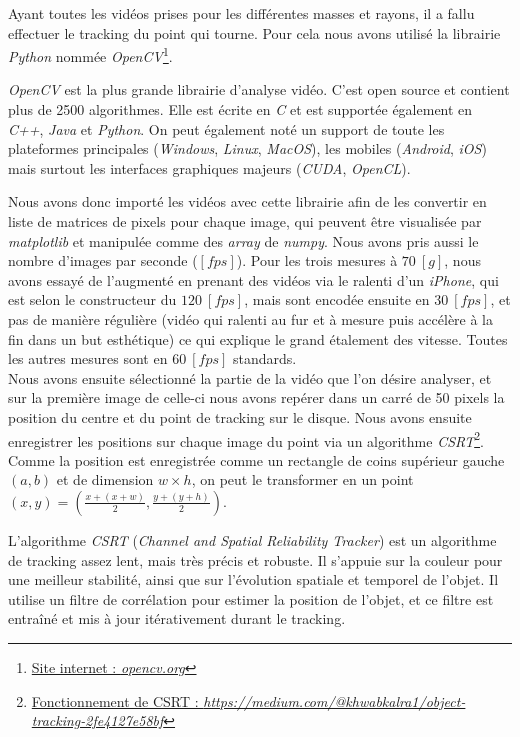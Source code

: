 
Ayant toutes les vidéos prises pour les différentes masses et rayons, il a fallu effectuer le tracking du point qui tourne. Pour cela nous avons utilisé la librairie \emph{Python} nommée \textit{OpenCV}\footnote{\href{opencv.org}{Site internet : \textit{opencv.org}}}.\\ 
\begin{invsummary}
\textit{OpenCV} est la plus grande librairie d'analyse vidéo. C'est open source et contient plus de 2500 algorithmes. Elle est écrite en \emph{C} et est supportée également en \emph{C++}, \emph{Java} et \emph{Python}. On peut également noté un support de toute les plateformes principales (\textit{Windows}, \textit{Linux}, \textit{MacOS}), les mobiles (\textit{Android}, \textit{iOS}) mais surtout les interfaces graphiques majeurs (\textit{CUDA}, \textit{OpenCL}).
\end{invsummary}
Nous avons donc importé les vidéos avec cette librairie afin de les convertir en liste de matrices de pixels pour chaque image, qui peuvent être visualisée par \textit{matplotlib} et manipulée comme des \textit{array} de \textit{numpy}. Nous avons pris aussi le nombre d'images par seconde ($[fps]$). Pour les trois mesures à $70 \ [g]$, nous avons essayé de l'augmenté en prenant des vidéos via le ralenti d'un \textit{iPhone}, qui est selon le constructeur du $120 \ [fps]$, mais sont encodée ensuite en $30 \ [fps]$, et pas de manière régulière (vidéo qui ralenti au fur et à mesure puis accélère à la fin dans un but esthétique) ce qui explique le grand étalement des vitesse. Toutes les autres mesures sont en $60 \ [fps]$ standards.\\
Nous avons ensuite sélectionné la partie de la vidéo que l'on désire analyser, et sur la première image de celle-ci nous avons repérer dans un carré de 50 pixels la position du centre et du point de tracking sur le disque. Nous avons ensuite enregistrer les positions sur chaque image du point via un algorithme \textit{CSRT}\footnote{\href{https://medium.com/@khwabkalra1/object-tracking-2fe4127e58bf}{Fonctionnement de CSRT : \textit{https://medium.com/@khwabkalra1/object-tracking-2fe4127e58bf}}}. Comme la position est enregistrée comme un rectangle de coins supérieur gauche $(a,b)$ et de dimension $w \times h$, on peut le transformer en un point $(x,y) = (\frac{x+(x+w)}{2},\frac{y+(y+h)}{2})$.\\
\begin{summary}
L'algorithme \textit{CSRT} (\textit{Channel and Spatial Reliability Tracker}) est un algorithme de tracking assez lent, mais très précis et robuste. Il s'appuie sur la couleur pour une meilleur stabilité, ainsi que sur l'évolution spatiale et temporel de l'objet. Il utilise un filtre de corrélation pour estimer la position de l'objet, et ce filtre est entraîné et mis à jour itérativement durant le tracking.
\end{summary}
